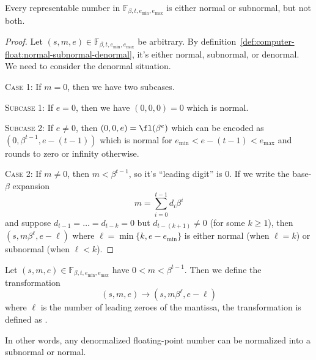 \begin{thm}
  Every representable number in $\mathbb{F}_{\beta,t,e_{\text{min}},e_{\text{max}}}$
  is either normal or subnormal, but not both.
\end{thm}
\begin{proof}
  Let  $(s,m,e)\in\mathbb{F}_{\beta,t,e_{\text{min}},e_{\text{max}}}$ be
  arbitrary. By
  definition~\ref{def:computer-float:normal-subnormal-denormal},
  it's either normal, subnormal, or denormal. We need to consider the
  denormal situation.

  \textsc{Case 1:} If $m=0$, then we have two subcases.

  {}\quad\textsc{Subcase 1:} If $e=0$, then we have $(0,0,0)=0$ which is
  normal.

  {}\quad\textsc{Subcase 2:} If $e\neq0$, then $(0,0,e)=\fl(\beta^{e})$
  which can be encoded as $(0,\beta^{t-1}, e-(t-1))$ which is normal for
  $e_{\text{min}}<e-(t-1)<e_{\text{max}}$ and rounds to zero or infinity
  otherwise.

  \textsc{Case 2:} If $m\neq0$, then $m<\beta^{t-1}$, so it's ``leading
  digit'' is 0. If we write the base-$\beta$ expansion
  \begin{equation}
    m=\sum^{t-1}_{i=0}d_{i}\beta^{i}
  \end{equation}
  and suppose $d_{t-1}=\dots=d_{t-k}=0$ but $d_{t-(k+1)}\neq0$ (for some
  $k\geq1$), then $(s,m\beta^{\ell},e-\ell)$ where $\ell=\min\{k,e-e_{\text{min}}\}$
  is either normal (when $\ell=k$) or subnormal (when $\ell<k$).
\end{proof}

\begin{defn}
Let $(s,m,e)\in\mathbb{F}_{\beta,t,e_{\text{min}},e_{\text{max}}}$
have $0<m<\beta^{t-1}$. Then we define the transformation
\begin{equation}
  (s,m,e)\to(s,m\beta^{\ell},e-\ell)
\end{equation}
where $\ell$ is the number of leading zeroes of the mantissa, the
transformation is defined as .
\end{defn}

\begin{rmk}
In other words, any denormalized floating-point number can be normalized
into a subnormal or normal.
\end{rmk}


